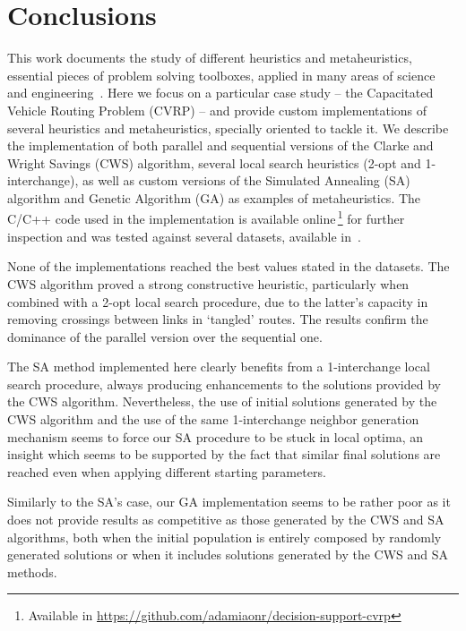 \section{Conclusions}
\label{sec:conclusions}

This work documents the study of different heuristics and metaheuristics, 
essential pieces of problem solving toolboxes, applied in many areas of 
science and engineering~\cite{6603883,Kytojoki2007,becker2013evaluation}. Here 
we focus on a particular case study -- the Capacitated Vehicle Routing Problem 
(CVRP) -- and provide custom implementations of several 
heuristics and metaheuristics, specially oriented to tackle it. We 
describe the implementation of both parallel and 
sequential versions of the Clarke and Wright Savings (CWS) algorithm, several 
local search heuristics (2-opt and 1-interchange), as well as custom versions 
of the Simulated Annealing (SA) algorithm and Genetic Algorithm (GA) as 
examples of metaheuristics. The C\slash C++ code used in the implementation is 
available online\,\footnote{Available in \url{https://github.com/adamiaonr/decision-support-cvrp}} for further inspection and was tested against several 
datasets, available in~\cite{website:cvrp-datasets}.\vertbreak

None of the implementations reached the best values stated in the datasets. The 
CWS algorithm proved a strong constructive heuristic, particularly when combined 
with a 2-opt local search procedure, due to the latter's capacity in removing 
crossings between links in `tangled' routes. The results confirm the dominance 
of the parallel version over the sequential one.\vertbreak 

The SA method implemented here clearly benefits from a 1-interchange local 
search procedure, always producing enhancements to the solutions provided by the 
CWS algorithm. Nevertheless, the 
use of initial solutions generated by the CWS algorithm and the use of the same 
1-interchange neighbor generation mechanism seems to force our SA procedure to 
be stuck in local optima, an insight which seems to be supported by the 
fact that similar final solutions are reached even when applying different starting 
parameters.\vertbreak

Similarly to the SA's case, our GA implementation seems to be rather poor as it 
does not provide results as competitive as those generated by the CWS and SA 
algorithms, both when the initial population is entirely composed by randomly 
generated solutions or when it includes solutions generated by the CWS and SA 
methods.



